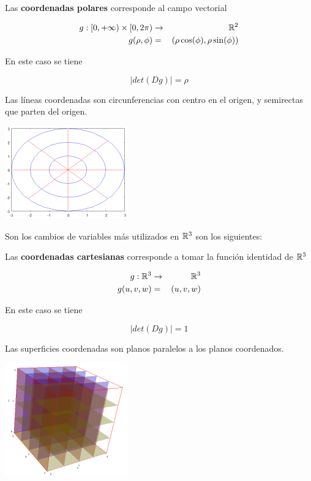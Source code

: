 \begin{definition}[Polares] 
Las \textbf{coordenadas polares} corresponde al campo vectorial

\begin{eqnarray*} g : [0, +\infty) \times [0, 2\pi) &\to& \mathbb{R}^2 \\
 g(\rho, \phi) &=& ( \rho \cos(\phi), \rho \sin(\phi) ) \end{eqnarray*}

En este caso se tiene

$$ |det(Dg)| = \rho $$

Las líneas coordenadas son circunferencias con centro en el origen, y semirectas que parten del origen.

\begin{center}
\includegraphics{images/04_analisis2/coord_polares.png}
\end{center}
\end{definition}

Son los cambios de variables más utilizados en $\mathbb{R}^3$ son los siguientes:

\begin{definition}[Cartesianas]
Las \textbf{coordenadas cartesianas} corresponde a tomar la función identidad de $\mathbb{R}^3$

\begin{eqnarray*} g: \mathbb{R}^3 &\to& \mathbb{R}^3 \\
g(u,v,w) &=& (u,v,w) \end{eqnarray*}

En este caso se tiene

$$ |det(Dg)| = 1$$

Las superficies coordenadas son planos paralelos a los planos coordenados.

\begin{center}
\includegraphics{images/04_analisis2/coord_cart3d.png}
\end{center}
\end{definition}

